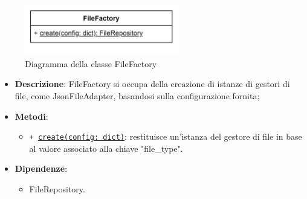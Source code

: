  \label{FileFactory}
\begin{figure}[H]
    \centering
    \includegraphics[width=0.6\textwidth]{assets/Backend/file_factory.png}
    \caption{Diagramma della classe FileFactory}
  \end{figure}
\begin{itemize}
    \item \textbf{Descrizione}: FileFactory si occupa della creazione di istanze di gestori di file, come JsonFileAdapter, basandosi sulla configurazione fornita;
    \item \textbf{Metodi}:
    \begin{itemize}
        \item \texttt{+ \underline{create(config: dict)}}: restituisce un'istanza del gestore di file in base al valore associato alla chiave "file\_type".
    \end{itemize}
    \item \textbf{Dipendenze}:
    \begin{itemize}
        \item FileRepository.
    \end{itemize}
\end{itemize} 

